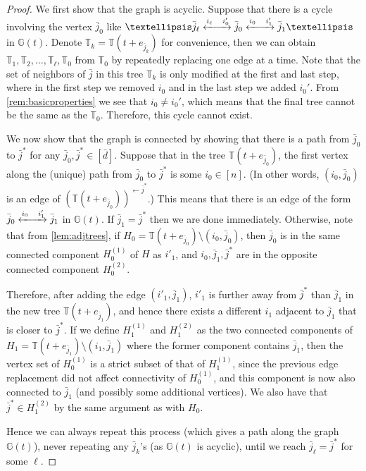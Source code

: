 \documentclass[10pt,a4paper]{amsart}
\begin{document}
\begin{proof}
    We first show that the graph is acyclic. Suppose that there is a cycle involving the vertex $\bar{j}_0$ like $\dots \bar{j}_\ell \xleftrightarrow{i_{\ell}\quad i'_0} \bar{j}_0 \xleftrightarrow{i_0\quad i'_{1}} \bar{j}_1 \dots$ in $\mathbb{G}(t)$. Denote $\mathbb{T}_k = \mathbb{T}(t+e_{\bar{j}_k})$ for convenience, then we can obtain $\mathbb{T}_1, \mathbb{T}_2, \dots, \mathbb{T}_\ell, \mathbb{T}_0 $ from $\mathbb{T}_0$ by repeatedly replacing one edge at a time. Note that the set of neighbors of $\bar{j}$ in this tree $\mathbb{T}_k$ is only modified at the first and last step, where in the first step we removed $i_0$ and in the last step we added $i_0'$. From \cref{rem:basicproperties} we see that $i_0 \neq i_0'$, which means that the final tree cannot be the same as the $\mathbb{T}_0$. Therefore, this cycle cannot exist.

    We now show that the graph is connected by showing that there is a path from $\bar{j}_0$ to $\bar{j}^*$ for any $\bar{j}_0, \bar{j}^*\in [\bar{d}]$. Suppose that in the tree $\mathbb{T}(t+e_{\bar{j}_0})$, the first vertex along the (unique) path from $\bar{j}_0$ to $\bar{j}^*$ is some $i_0\in [n]$. (In other words, $(i_0, \bar{j}_0)$ is an edge of $(\mathbb{T}(t+e_{\bar{j}_0}))^{\leftarrow\bar{j}^*}$.) This means that there is an edge of the form $\bar{j}_0 \xleftrightarrow{i_0\quad i'_1}\bar{j}_1$ in $\mathbb{G}(t)$. If $\bar{j}_1 = \bar{j}^*$ then we are done immediately. 
    Otherwise, note that from \cref{lem:adjtrees}, if $H_0 = \mathbb{T}(t+e_{\bar{j}_0})\setminus (i_0, \bar{j}_0)$, then $\bar{j}_0$ is in the same connected component $H_0^{(1)}$ of $H$ as $i'_1$, and $i_0, \bar{j}_1, \bar{j}^*$ are in the opposite connected component $H_0^{(2)}$. 
    
    Therefore, after adding the edge $(i'_1, \bar{j}_1)$, $i'_1$ is further away from $\bar{j}^*$ than $\bar{j}_1$ in the new tree $\mathbb{T}(t+e_{\bar{j}_1})$, and hence there exists a different $i_1$ adjacent to $\bar{j}_1$ that is closer to $\bar{j}^*$. If we define $H_1^{(1)}$ and $H_1^{(2)}$ as the two connected components of $H_1 = \mathbb{T}(t+e_{\bar{j}_1})\setminus (i_1, \bar{j}_1)$ where the former component contains $\bar{j}_1$, then the vertex set of $H_0^{(1)}$ is a strict subset of that of $H_1^{(1)}$, since the previous edge replacement did not affect connectivity of $H_0^{(1)}$, and this component is now also connected to $\bar{j}_1$ (and possibly some additional vertices). We also have that $\bar{j}^*\in H_1^{(2)}$ by the same argument as with $H_0$.
    
    Hence we can always repeat this process (which gives a path along the graph $\mathbb{G}(t)$), never repeating any $\bar{j}_k$'s (as $\mathbb{G}(t)$ is acyclic), until we reach $\bar{j}_\ell = \bar{j}^*$ for some $\ell$.
\end{proof}
\end{document}
